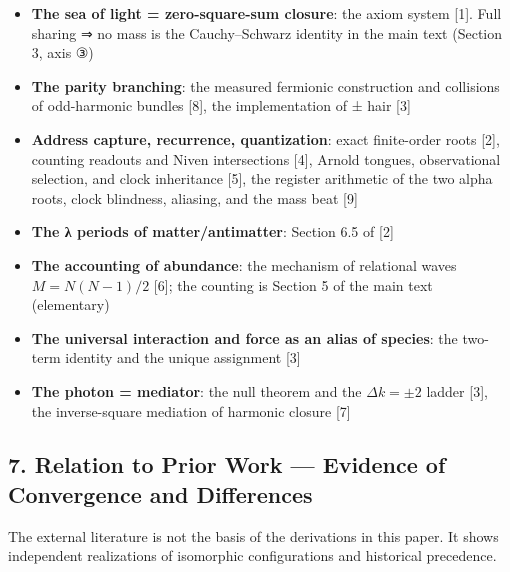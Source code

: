 \documentclass[
  a4paper,
]{article}
\providecommand{\tightlist}{%
  \setlength{\itemsep}{0pt}\setlength{\parskip}{0pt}}
\begin{document}
\begin{itemize}
\tightlist
\item
  \textbf{The sea of light = zero-square-sum closure}: the axiom system
  {[}1{]}. Full sharing ⇒ no mass is the Cauchy--Schwarz identity in the
  main text (Section 3, axis ③)
\item
  \textbf{The parity branching}: the measured fermionic construction and
  collisions of odd-harmonic bundles {[}8{]}, the implementation of ±
  hair {[}3{]}
\item
  \textbf{Address capture, recurrence, quantization}: exact finite-order
  roots {[}2{]}, counting readouts and Niven intersections {[}4{]},
  Arnold tongues, observational selection, and clock inheritance
  {[}5{]}, the register arithmetic of the two alpha roots, clock
  blindness, aliasing, and the mass beat {[}9{]}
\item
  \textbf{The λ periods of matter/antimatter}: Section 6.5 of {[}2{]}
\item
  \textbf{The accounting of abundance}: the mechanism of relational
  waves \(M=N(N-1)/2\) {[}6{]}; the counting is Section 5 of the main
  text (elementary)
\item
  \textbf{The universal interaction and force as an alias of species}:
  the two-term identity and the unique assignment {[}3{]}
\item
  \textbf{The photon = mediator}: the null theorem and the
  \(\Delta k=\pm2\) ladder {[}3{]}, the inverse-square mediation of
  harmonic closure {[}7{]}
\end{itemize}

\subsection{7. Relation to Prior Work --- Evidence of Convergence and
Differences}\label{relation-to-prior-work-evidence-of-convergence-and-differences}

The external literature is not the basis of the derivations in this
paper. It shows independent realizations of isomorphic configurations
and historical precedence.
\end{document}
